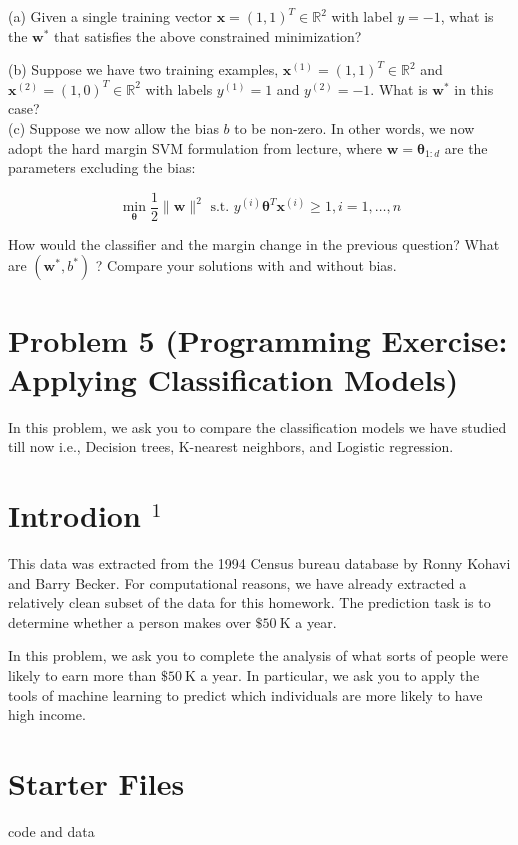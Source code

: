 \documentclass[10pt]{article}
\begin{document}
(a) Given a single training vector $\mathbf{x}=(1,1)^{T} \in \mathbb{R}^{2}$ with label $y=-1$, what is the $\mathbf{w}^{*}$ that satisfies the above constrained minimization?

(b) Suppose we have two training examples, $\mathbf{x}^{(1)}=(1,1)^{T} \in \mathbb{R}^{2}$ and $\mathbf{x}^{(2)}=(1,0)^{T} \in \mathbb{R}^{2}$ with labels $y^{(1)}=1$ and $y^{(2)}=-1$. What is $\mathbf{w}^{*}$ in this case?\\
(c) Suppose we now allow the bias $b$ to be non-zero. In other words, we now adopt the hard margin SVM formulation from lecture, where $\mathbf{w}=\boldsymbol{\theta}_{1: d}$ are the parameters excluding the bias:

$$
\min _{\boldsymbol{\theta}} \frac{1}{2}\|\mathbf{w}\|^{2} \text { s.t. } y^{(i)} \boldsymbol{\theta}^{T} \mathbf{x}^{(i)} \geq 1, i=1, \ldots, n
$$

How would the classifier and the margin change in the previous question? What are $\left(\mathbf{w}^{*}, b^{*}\right)$ ? Compare your solutions with and without bias.

\section*{Problem 5 (Programming Exercise: Applying Classification Models)}
In this problem, we ask you to compare the classification models we have studied till now i.e., Decision trees, K-nearest neighbors, and Logistic regression.

\section*{Introdion $^{1}$}
This data was extracted from the 1994 Census bureau database by Ronny Kohavi and Barry Becker. For computational reasons, we have already extracted a relatively clean subset of the data for this homework. The prediction task is to determine whether a person makes over $\$ 50 \mathrm{~K}$ a year.

In this problem, we ask you to complete the analysis of what sorts of people were likely to earn more than $\$ 50 \mathrm{~K}$ a year. In particular, we ask you to apply the tools of machine learning to predict which individuals are more likely to have high income.

\section*{Starter Files}
code and data
\end{document}
